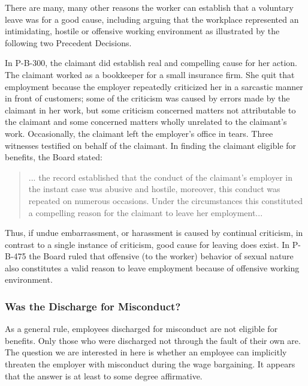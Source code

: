 \documentclass[12pt]{article}
\newcommand{\1}{\mathbf{1}}
\begin{document}
\begin{appendix}
There are many, many other reasons the worker can establish that a voluntary leave was for a good cause, including arguing that the workplace represented an intimidating, hostile or offensive working environment as illustrated by the following two Precedent Decisions.

In P-B-300, the claimant did establish real and compelling cause for her action. The claimant worked as a bookkeeper for a small insurance firm. She quit that employment because the employer repeatedly criticized her in a sarcastic manner in front of customers; some of the criticism was caused by errors made by the claimant in her work, but some criticism concerned matters not attributable to the claimant and some concerned matters wholly unrelated to the claimant's work. Occasionally, the claimant left the employer's office in tears. Three witnesses testified on behalf of the claimant. In finding the claimant eligible for benefits, the Board stated:
\begin{quotation}
... the record established that the conduct of the claimant's employer in the instant case was abusive and hostile, moreover, this conduct was repeated on numerous occasions. Under the circumstances this constituted a compelling reason for the claimant to leave her employment...
\end{quotation}

Thus, if undue embarrassment, or harassment is caused by continual criticism, in contrast to a single instance of criticism, good cause for leaving does exist. In P-B-475 the Board ruled that offensive (to the worker) behavior of sexual nature also constitutes a valid reason to leave employment because of offensive working environment.\\




\subsubsection{Was the Discharge for Misconduct?}
\label{app:misconduct}
As a general rule, employees discharged for misconduct are not eligible for benefits. Only those who were discharged not through the fault of their own are. The question we are interested in here is whether an employee can implicitly threaten the employer with misconduct during the wage bargaining. It appears that the answer is at least to some degree affirmative.


\vspace{0.5cm}


\end{appendix}
\end{document}
